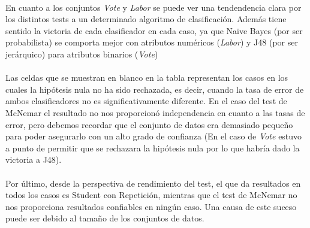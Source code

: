 \documentclass[10pt, a4paper,spanish]{article}
\begin{document}
		\paragraph{}
		En cuanto a los conjuntos \emph{Vote} y \emph{Labor} se puede ver una tendendencia clara por los distintos tests a un determinado algoritmo de clasificación. Además tiene sentido la victoria de cada clasificador en cada caso, ya que Naive Bayes (por ser probabilista) se comporta mejor con atributos numéricos (\emph{Labor}) y J48 (por ser jerárquico) para atributos binarios (\emph{Vote})

		\paragraph{}
		Las celdas que se muestran en blanco en la tabla representan los casos en los cuales la hipótesis nula no ha sido rechazada, es decir, cuando la tasa de error de ambos clasificadores no es significativamente diferente. En el caso del test de McNemar el resultado no nos proporcionó independencia en cuanto a las tasas de error, pero debemos recordar que el conjunto de datos era demasiado pequeño para poder asegurarlo con un alto grado de confianza (En el caso de \emph{Vote} estuvo a punto de permitir que se rechazara la hipótesis nula por lo que habría dado la victoria a J48).

		\paragraph{}
		Por último, desde la perspectiva de rendimiento del test, el que da resultados en todos los casos es Student con Repetición, mientras que el test de McNemar no nos proporciona resultados confiables en ningún caso. Una causa de este suceso puede ser debido al tamaño de los conjuntos de datos.
\end{document}
